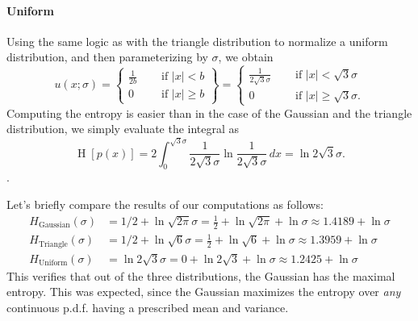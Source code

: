 \documentclass[12pt, a4paper]{article}
\newcommand{\abs}[1]{\left\lvert#1\right\rvert}
\renewcommand{\H}{\operatorname{H}}
\begin{document}
\paragraph{Uniform}
Using the same logic as with the triangle distribution to normalize a uniform distribution, and then parameterizing by $\sigma$, we obtain
\begin{equation*}
u(x; \sigma) =
\left\{\!\begin{aligned}
\frac{1}{2b} &\quad \text{ if } \abs{x} < b \\
0 &\quad \text{ if } \abs{x} \geq b 
\end{aligned}\right\}
= 
\left\{\!\begin{aligned}
\frac{1}{2\sqrt{3}\sigma} &\quad \text{ if } \abs{x} <\sqrt{3}\sigma \\
0 &\quad \text{ if } \abs{x} \geq \sqrt{3}\sigma.
\end{aligned}\right.
\end{equation*}
Computing the entropy is easier than in the case of the Gaussian and the triangle distribution, we simply evaluate the integral as
\begin{equation*}
\H\left[p(x)\right] =2  \int_0^{\sqrt{3} \sigma} \frac{1}{2\sqrt{3}\sigma} \ln \frac{1}{2\sqrt{3}\sigma}  \, dx = \ln 2 \sqrt{3} \sigma.
\end{equation*}.

Let's briefly compare the results of our computations as follows:
\begin{align*}
	H_\text{Gaussian}(\sigma) &= 1/2 + \ln \sqrt{2 \pi } \sigma = \frac{1}{2} + \ln \sqrt{2\pi}  + \ln \sigma \approx 1.4189 + \ln \sigma \\
	H_\text{Triangle}(\sigma) &= 1/2 + \ln \sqrt{6} \sigma = \frac{1}{2} + \ln \sqrt{6} + \ln \sigma \approx 1.3959 + \ln \sigma \\
	H_\text{Uniform}(\sigma) &= \ln 2 \sqrt{3} \sigma = 0 + \ln 2 \sqrt{3} + \ln \sigma \approx 1.2425 + \ln \sigma
\end{align*}
This verifies that out of the three distributions, the Gaussian has the maximal entropy.
This was expected, since the Gaussian maximizes the entropy over \emph{any} continuous p.d.f. having a prescribed mean and variance.
\end{document}
